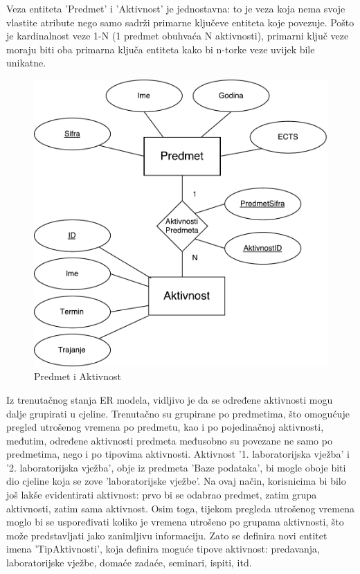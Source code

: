 \documentclass[times, utf8, zavrsni]{fer}
\begin{document}
Veza entiteta 'Predmet' i 'Aktivnost' je jednostavna: to je veza koja nema svoje vlastite atribute nego samo sadrži primarne ključeve entiteta koje povezuje. Pošto je kardinalnost veze 1-N (1 predmet obuhvaća N aktivnosti), primarni ključ veze moraju biti oba primarna ključa entiteta kako bi n-torke veze uvijek bile unikatne.\\

\begin{figure}[H]
\centering
\includegraphics[width=\textwidth,height=\textheight,keepaspectratio]{img/predmet-aktivnost.pdf}
\caption{Predmet i Aktivnost}
\label{fig:predmet-aktivnost}
\end{figure}

Iz trenutačnog stanja ER modela, vidljivo je da se određene aktivnosti mogu dalje grupirati u cjeline. Trenutačno su grupirane po predmetima, što omogućuje pregled utrošenog vremena po predmetu, kao i po pojedinačnoj aktivnosti, međutim, određene aktivnosti predmeta međusobno su povezane ne samo po predmetima, nego i po tipovima aktivnosti. Aktivnost '1. laboratorijska vježba' i '2. laboratorijska vježba', obje iz predmeta 'Baze podataka', bi mogle oboje biti dio cjeline koja se zove 'laboratorijske vježbe'. Na ovaj način, korisnicima bi bilo još lakše evidentirati aktivnost: prvo bi se odabrao predmet, zatim grupa aktivnosti, zatim sama aktivnost. Osim toga, tijekom pregleda utrošenog vremena moglo bi se uspoređivati koliko je vremena utrošeno po grupama aktivnosti, što može predstavljati jako zanimljivu informaciju. Zato se definira novi entitet imena 'TipAktivnosti', koja definira moguće tipove aktivnost: predavanja, laboratorijske vježbe, domaće zadaće, seminari, ispiti, itd.\\
\end{document}
